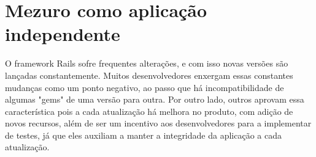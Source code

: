 
\section{Mezuro como aplicação independente}


O framework Rails sofre frequentes alterações, e com isso novas versões são lançadas constantemente. Muitos desenvolvedores enxergam essas constantes mudanças como um ponto negativo, ao passo que há incompatibilidade de algumas "gems" de uma versão para outra. Por outro lado, outros aprovam essa característica pois a cada atualização há melhora no produto, com adição de novos recursos, além de ser um incentivo aos desenvolvedores para a implementar de testes, já que eles auxiliam a manter a integridade da aplicação a cada atualização.

  


